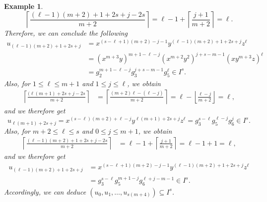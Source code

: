 \documentclass[11pt]{amsart}
\newtheorem{example}[theorem]{Example}
\begin{document}
\begin{example}
{$$\left\lceil \frac{(\ell-1)(m+2)+1+2s+j-2s}{m+2}\right\rceil = \ell-1 + 
\left\lceil \frac{j+1}{m+2}\right\rceil = \ell.$$
Therefore, we can conclude the following 
\begin{align*}
u_{(\ell-1)(m+2)+ 1+ 2s + j} &= x^{(s-\ell+1)(m+2)-j-1}y^{(\ell-1)(m+2)+ 1+ 2s + j}z^{\ell} \\
                             & = (x^{m+3}y)^{m+1-\ell-j}(x^{m+2}y^2)^{j+s-m-1}(xy^{m+3}z)^{\ell}\\
                             &= g_2^{m+1-\ell-j}g_3^{j+s-m-1}g_5^{\ell}\in I^{s}.
\end{align*}
Also, for $1\leq \ell\leq m+1$ and $1\leq j\leq \ell$, we obtain 
\[
\begin{aligned}
\left\lceil \frac{(\ell(m+1)+2s+j-2s}{m+2}\right\rceil
&=\left\lceil \frac{(m+2)\ell-(\ell-j)}{m+2}\right\rceil 
=\ell-\left\lfloor\frac{\ell-j}{m+2}\right\rfloor=\ell,
\end{aligned}
\]
and we therefore get 
$$u_{\ell(m+1)+2s+j} = x^{(s-\ell)(m+2)+\ell-j}y^{\ell(m+1)+2s+j}z^{\ell} = 
g_3^{s-\ell}g_5^{\ell-j}g_6^j\in I^{s}.$$
Also, for $m+2\leq\ell\leq s$ and $0\leq j\leq m+1$, we obtain
\[
\begin{aligned}
\left\lceil \frac{(\ell-1)(m+2)+1+2s+j-2s}{m+2}\right\rceil
&= \ell-1 + \left\lceil \frac{j+1}{m+2}\right\rceil 
=\ell-1+1=\ell,
\end{aligned}
\]
and we therefore get \[
\begin{aligned}
u_{(\ell-1)(m+2)+1+2s+j} &= x^{(s-\ell+1)(m+2)-j-1}y^{(\ell-1)(m+2)+1+2s+j}z^{\ell}\\
& =  g_3^{s-\ell} g_5^{m+1-j} g_6^{\ell+j-m-1} \in I^s.
\end{aligned}
\]
Accordingly, we can deduce  $(u_0,u_1,\ldots,u_{s(m+4)}) \subseteq I^{s}$. 

}
\end{example}
\end{document}
